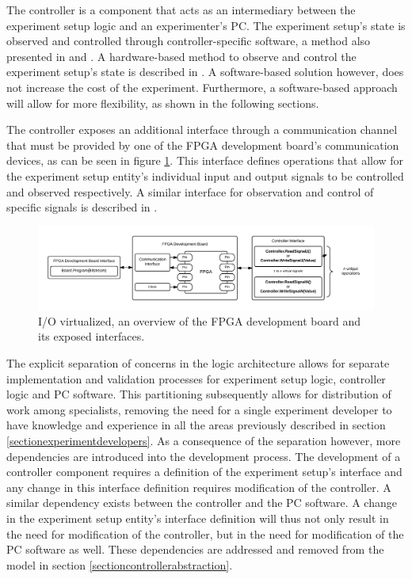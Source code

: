 \documentclass[openright]{template/uva-bachelor-thesis}
\begin{document}

The controller is a component that acts as an intermediary between the experiment setup logic and an experimenter's PC. The experiment setup's state is observed and controlled through controller-specific software, a method also presented in \cite{holland2003harnessing} and \cite{bulic2013fpga}. A hardware-based method to observe and control the experiment setup's state is described in \cite{al2007teaching}. A software-based solution however, does not increase the cost of the experiment. Furthermore, a software-based approach will allow for more flexibility, as shown in the following sections. 

The controller exposes an additional interface through a communication channel that must be provided by one of the FPGA development board's communication devices, as can be seen in figure \ref{fig:overview-inout}. This interface defines operations that allow for the experiment setup entity's individual input and output signals to be controlled and observed respectively. A similar interface for observation and control of specific signals is described in \cite{holland2003harnessing}. 

\begin{figure}[h]
\centering
\includegraphics[width=\textwidth]{img/overview-inout}
\caption{I/O virtualized, an overview of the FPGA development board and its exposed interfaces.}
\label{fig:overview-inout}
\end{figure}

The explicit separation of concerns in the logic architecture allows for separate implementation and validation processes for experiment setup logic, controller logic and PC software. This partitioning subsequently allows for distribution of work among specialists, removing the need for a single experiment developer to have knowledge and experience in all the areas previously described in section  \ref{sectionexperimentdevelopers}. As a consequence of the separation however, more dependencies are introduced into the development process. The development of a controller component requires a definition of the experiment setup's interface and any change in this interface definition requires modification of the controller. A similar dependency exists between the controller and the PC software. A change in the experiment setup entity's interface definition will thus not only result in the need for modification of the controller, but in the need for modification of the PC software as well. These dependencies are addressed and removed from the model in section \ref{sectioncontrollerabstraction}.
\end{document}
